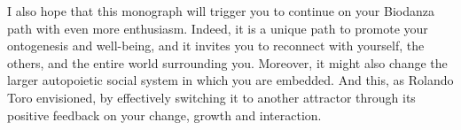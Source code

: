 \documentclass[
  11pt,
]{book}
\begin{document}
I also hope that this monograph will trigger you to continue on your Biodanza path with even more enthusiasm. Indeed, it is a unique path to promote your ontogenesis and well-being, and it invites you to reconnect with yourself, the others, and the entire world surrounding you. Moreover, it might also change the larger autopoietic social system in which you are embedded. And this, as Rolando Toro envisioned, by effectively switching it to another attractor through its positive feedback on your change, growth and interaction.

  
\end{document}
